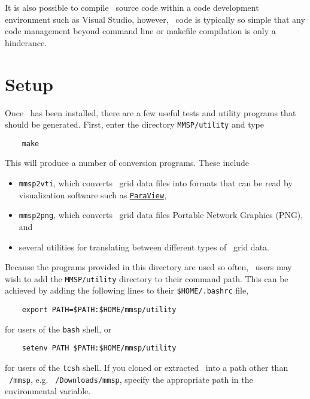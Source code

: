 It is also possible to compile \MMSP\ source code within a code development environment such as Visual Studio, however, \MMSP\ code is typically so simple that any code management beyond command line or makefile compilation is only a hinderance.

\section{Setup}
Once \MMSP\ has been installed, there are a few useful tests and utility programs that should be generated.  First, enter the directory {\tt MMSP/utility} and type
\begin{shadebox}
\begin{verbatim}
    make
\end{verbatim}
\end{shadebox}
This will produce a number of conversion programs.  These include
\begin{itemize}
  \item {\tt mmsp2vti}, which converts \MMSP\ grid data files into formats that can be read by visualization software such as \href{http://www.paraview.org}{\tt ParaView},
  \item {\tt mmsp2png}, which converts \MMSP\ grid data files Portable Network Graphics (PNG), and
  \item several utilities for translating between different types of \MMSP\ grid data.
\end{itemize}
Because the programs provided in this directory are used so often, \MMSP\ users may wish to add the {\tt MMSP/utility} directory to their command path.  This can be achieved by adding the following lines to their {\tt \$HOME/.bashrc} file,
\begin{shadebox}
\begin{verbatim}
    export PATH=$PATH:$HOME/mmsp/utility
\end{verbatim}
\end{shadebox}
for users of the {\tt bash} shell, or
\begin{shadebox}
\begin{verbatim}
    setenv PATH $PATH:$HOME/mmsp/utility
\end{verbatim}
\end{shadebox}
for users of the {\tt tcsh} shell.  If you cloned or extracted \MMSP\ into a path other than {\tt ~/mmsp}, e.g. {\tt ~/Downloads/mmsp}, specify the appropriate path in the environmental variable.

